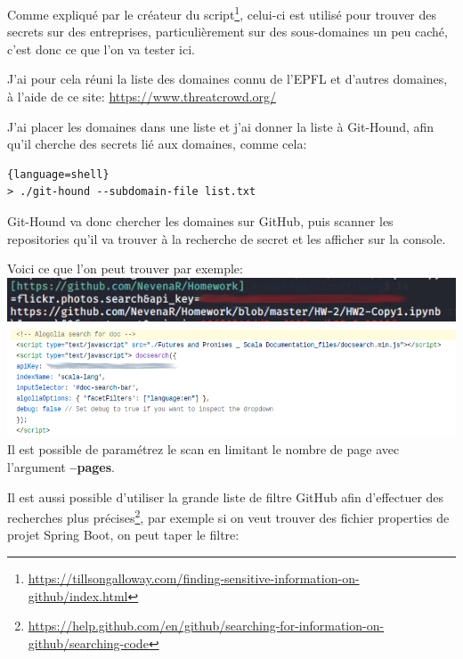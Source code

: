 Comme expliqué par le créateur du script\footnote{\url{https://tillsongalloway.com/finding-sensitive-information-on-github/index.html}}, 
celui-ci est utilisé pour trouver des secrets sur des entreprises, particulièrement sur des sous-domaines un peu caché, c'est donc ce que l'on va tester ici.

J'ai pour cela réuni la liste des domaines connu de l'EPFL et d'autres domaines, à l'aide de ce site: \url{https://www.threatcrowd.org/}

J'ai placer les domaines dans une liste et j'ai donner la liste à Git-Hound, afin qu'il cherche des secrets lié aux domaines, comme cela:

\begin{lstlisting}{language=shell}
> ./git-hound --subdomain-file list.txt
\end{lstlisting}
  
Git-Hound va donc chercher les domaines sur GitHub, puis scanner les repositories qu'il va trouver à la recherche de secret et les afficher sur la console.

Voici ce que l'on peut trouver par exemple: \\

\includegraphics[scale=0.48]{images/SEN_Projet_Image014.png} \\

\includegraphics[scale=0.48]{images/SEN_Projet_Image013.png} \\

Il est possible de paramétrez le scan en limitant le nombre de page avec l'argument {\bfseries --pages}.

Il est aussi possible d'utiliser la grande liste de filtre GitHub afin d'effectuer des recherches plus précises\footnote{\url{https://help.github.com/en/github/searching-for-information-on-github/searching-code}},
par exemple si on veut trouver des fichier properties de projet Spring Boot, on peut taper le filtre:
\\

